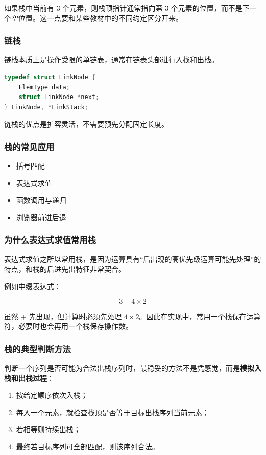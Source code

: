 \documentclass{../../note}
\begin{document}
如果栈中当前有 3 个元素，则栈顶指针通常指向第 3 个元素的位置，而不是下一个空位置。这一点要和某些教材中的不同约定区分开来。

\subsubsection{链栈}

链栈本质上是操作受限的单链表，通常在链表头部进行入栈和出栈。

\begin{lstlisting}[language=C]
typedef struct LinkNode {
    ElemType data;
    struct LinkNode *next;
} LinkNode, *LinkStack;
\end{lstlisting}

链栈的优点是扩容灵活，不需要预先分配固定长度。

\subsubsection{栈的常见应用}

\begin{itemize}
  \item 括号匹配
  \item 表达式求值
  \item 函数调用与递归
  \item 浏览器前进后退
\end{itemize}

\subsubsection{为什么表达式求值常用栈}

表达式求值之所以常用栈，是因为运算具有“后出现的高优先级运算可能先处理”的特点，和栈的后进先出特征非常契合。

例如中缀表达式：

\[
3 + 4 \times 2
\]

虽然 $+$ 先出现，但计算时必须先处理 $4 \times 2$。因此在实现中，常用一个栈保存运算符，必要时也会再用一个栈保存操作数。

\subsubsection{栈的典型判断方法}

判断一个序列是否可能为合法出栈序列时，最稳妥的方法不是凭感觉，而是\textbf{模拟入栈和出栈过程}：

\begin{enumerate}
  \item 按给定顺序依次入栈；
  \item 每入一个元素，就检查栈顶是否等于目标出栈序列当前元素；
  \item 若相等则持续出栈；
  \item 最终若目标序列可全部匹配，则该序列合法。
\end{enumerate}
\end{document}
